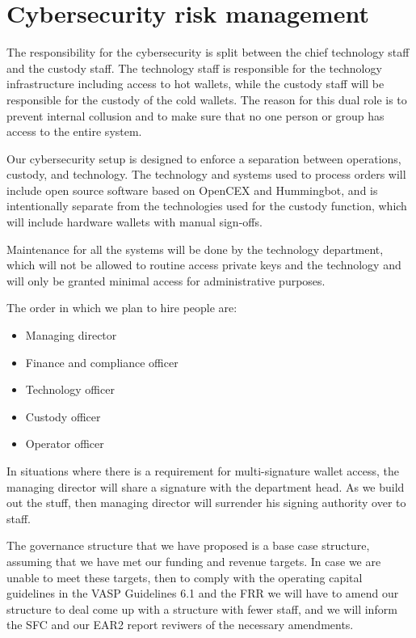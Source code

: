 \section{Cybersecurity risk management}

The responsibility for the cybersecurity is split between the chief
technology staff and the custody staff.  The technology staff is
responsible for the technology infrastructure including access to hot
wallets, while the custody staff will be responsible for the custody
of the cold wallets.  The reason for this dual role is to prevent
internal collusion and to make sure that no one person or group has
access to the entire system.

Our cybersecurity setup is designed to enforce a separation between
operations, custody, and technology.  The technology and systems used
to process orders will include open source software based on OpenCEX
and Hummingbot, and is intentionally separate from the technologies
used for the custody function, which will include hardware wallets with
manual sign-offs.

Maintenance for all the systems will be done by the technology
department, which will not be allowed to routine access private keys
and the technology and will only be granted minimal access for
administrative purposes.

The order in which we plan to hire people are:

\begin{itemize}
\item Managing director
\item Finance and compliance officer
\item Technology officer 
\item Custody officer
\item Operator officer
\end{itemize}

In situations where there is a requirement for multi-signature wallet
access, the managing director will share a signature with the
department head.  As we build out the stuff, then managing director
will surrender his signing authority over to staff.

The governance structure that we have proposed is a base case
structure, assuming that we have met our funding and revenue targets.
In case we are unable to meet these targets, then to comply with the
operating capital guidelines in the VASP Guidelines 6.1 and the FRR we
will have to amend our structure to deal come up with a structure with
fewer staff, and we will inform the SFC and our EAR2 report reviwers
of the necessary amendments.

